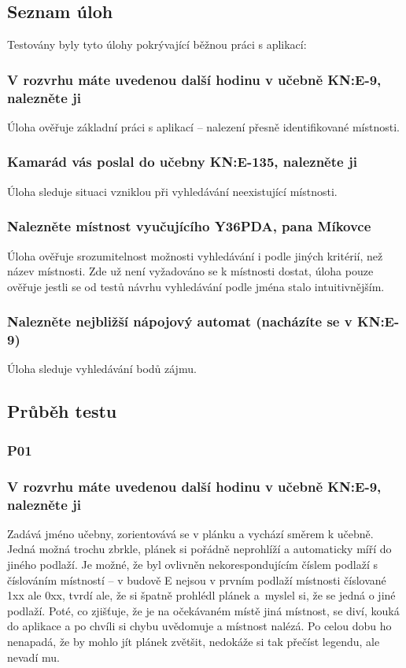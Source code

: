 \subsection{Seznam úloh}
Testovány byly tyto úlohy pokrývající běžnou práci s aplikací:
\subsubsection*{V rozvrhu máte uvedenou další hodinu v učebně KN:E-9, nalezněte ji}
Úloha ověřuje základní práci s aplikací -- nalezení přesně identifikované místnosti.
\subsubsection*{Kamarád vás poslal do učebny KN:E-135, nalezněte ji}
Úloha sleduje situaci vzniklou při vyhledávání neexistující místnosti.
\subsubsection*{Nalezněte místnost vyučujícího Y36PDA, pana Míkovce}
Úloha ověřuje srozumitelnost možnosti vyhledávání i podle jiných kritérií, než název místnosti. Zde už není vyžadováno se k místnosti dostat, úloha pouze ověřuje jestli se od testů návrhu vyhledávání podle jména stalo intuitivnějším.
\subsubsection*{Nalezněte nejbližší nápojový automat (nacházíte se v KN:E-9)}
Úloha sleduje vyhledávání bodů zájmu.

\subsection{Průběh testu}
\subsubsection{P01}
\subsubsection*{V rozvrhu máte uvedenou další hodinu v učebně KN:E-9, nalezněte ji}
Zadává jméno učebny, zorientovává se v plánku a vychází směrem k učebně. Jedná možná trochu zbrkle, plánek si pořádně neprohlíží a automaticky míří do jiného podlaží. Je možné, že byl ovlivněn nekorespondujícím číslem podlaží s číslováním místností -- v budově E nejsou v prvním podlaží místnosti číslované 1xx ale 0xx, tvrdí ale, že si špatně prohlédl plánek a~myslel si, že se jedná o jiné podlaží. Poté, co zjišťuje, že je na očekávaném místě jiná místnost, se diví, kouká do aplikace a po chvíli si chybu uvědomuje a místnost nalézá. Po celou dobu ho nenapadá, že by mohlo jít plánek zvětšit, nedokáže si tak přečíst legendu, ale nevadí mu.
